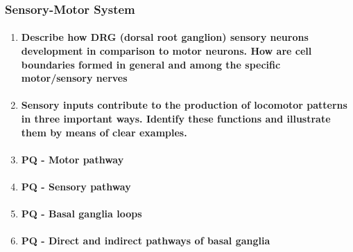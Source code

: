 \documentclass[12pt,article,oneside,a4paper]{memoir}
\begin{document}
\subsubsection{Sensory-Motor System}
\begin{enumerate}
\item \paragraph{Describe how DRG (dorsal root ganglion) sensory neurons development in comparison to motor neurons. How are cell boundaries formed in general and among the specific motor/sensory nerves}

\item \paragraph{Sensory inputs contribute to the production of locomotor patterns in three important ways. Identify these functions and illustrate them by means of clear examples.}

\item \paragraph{PQ - Motor pathway}

\item \paragraph{PQ - Sensory pathway}

\item \paragraph{PQ - Basal ganglia loops}

\item \paragraph{PQ - Direct and indirect pathways of basal ganglia}
\end{enumerate}

\end{document}
